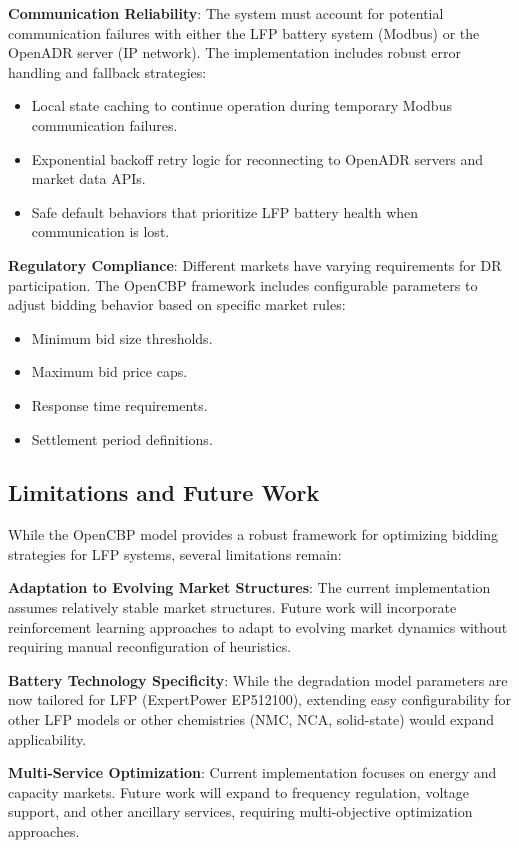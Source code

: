\documentclass[11pt,a4paper]{article}
\begin{document}
\textbf{Communication Reliability}: The system must account for potential communication failures with either the LFP battery system (Modbus) or the OpenADR server (IP network). The implementation includes robust error handling and fallback strategies:
\begin{itemize}
    \item Local state caching to continue operation during temporary Modbus communication failures.
    \item Exponential backoff retry logic for reconnecting to OpenADR servers and market data APIs.
    \item Safe default behaviors that prioritize LFP battery health when communication is lost.
\end{itemize}

\textbf{Regulatory Compliance}: Different markets have varying requirements for DR participation. The OpenCBP framework includes configurable parameters to adjust bidding behavior based on specific market rules:
\begin{itemize}
    \item Minimum bid size thresholds.
    \item Maximum bid price caps.
    \item Response time requirements.
    \item Settlement period definitions.
\end{itemize}

\subsection{Limitations and Future Work}
While the OpenCBP model provides a robust framework for optimizing bidding strategies for LFP systems, several limitations remain:

\textbf{Adaptation to Evolving Market Structures}: The current implementation assumes relatively stable market structures. Future work will incorporate reinforcement learning approaches to adapt to evolving market dynamics without requiring manual reconfiguration of heuristics.

\textbf{Battery Technology Specificity}: While the degradation model parameters are now tailored for LFP (ExpertPower EP512100), extending easy configurability for other LFP models or other chemistries (NMC, NCA, solid-state) would expand applicability.

\textbf{Multi-Service Optimization}: Current implementation focuses on energy and capacity markets. Future work will expand to frequency regulation, voltage support, and other ancillary services, requiring multi-objective optimization approaches.
\end{document}
